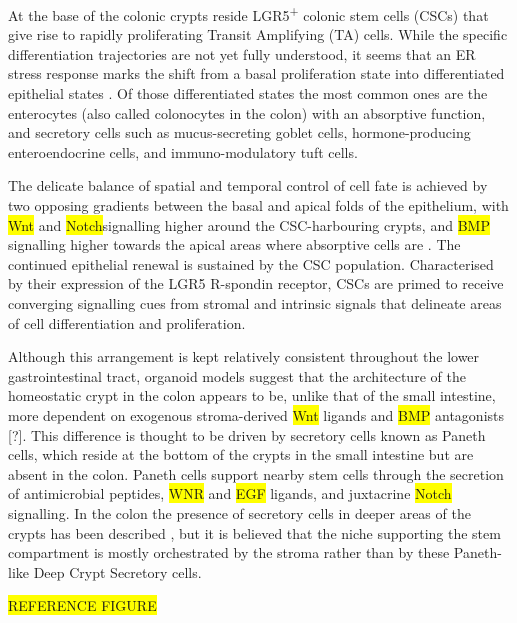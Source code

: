 At the base of the colonic crypts reside LGR5\textsuperscript{+} colonic stem cells (CSCs) that give rise to rapidly proliferating Transit Amplifying (TA) cells. While the specific differentiation trajectories are not yet fully understood, it seems that an ER stress response marks the shift from a basal proliferation state into differentiated epithelial states \cite{heijmans_er_2013, coleman_er_2019}. Of those differentiated states the most common ones are the enterocytes (also called colonocytes in the colon) with an absorptive function, and secretory cells such as mucus-secreting goblet cells, hormone-producing enteroendocrine cells, and immuno-modulatory tuft cells. 

The delicate balance of spatial and temporal control of cell fate is achieved by two opposing gradients between the basal and apical folds of the epithelium, with \colorbox{yellow}{Wnt} and \colorbox{yellow}{Notch}signalling higher around the CSC-harbouring crypts, and \colorbox{yellow}{BMP} signalling higher towards the apical areas where absorptive cells are \cite{bonis_intestinal_2021, beumer_cell_2021}. The continued epithelial renewal is sustained by the CSC population. Characterised by their expression of the LGR5 R-spondin receptor, CSCs are primed to receive converging signalling cues from stromal and intrinsic signals that delineate areas of cell differentiation and proliferation. 

Although this arrangement is kept relatively consistent throughout the lower gastrointestinal tract, organoid models\cite{sato_long-term_2011} suggest that the architecture of the homeostatic crypt in the colon appears to be, unlike that of the small intestine, more dependent on exogenous stroma-derived \colorbox{yellow}{Wnt} ligands and \colorbox{yellow}{BMP} antagonists [\cite{kondo_emerging_2019}?]. This difference is thought to be driven by secretory cells known as Paneth cells, which reside at the bottom of the crypts in the small intestine but are absent in the colon. Paneth cells support nearby stem cells through the secretion of antimicrobial peptides, \colorbox{yellow}{WNR} and \colorbox{yellow}{EGF} ligands, and juxtacrine \colorbox{yellow}{Notch} signalling. In the colon the presence of secretory cells in deeper areas of the crypts has been described \cite{sasaki_reg4_2016}, but it is believed that the niche supporting the stem compartment is mostly orchestrated by the stroma rather than by these Paneth-like Deep Crypt Secretory cells.

\colorbox{yellow}{REFERENCE FIGURE }

